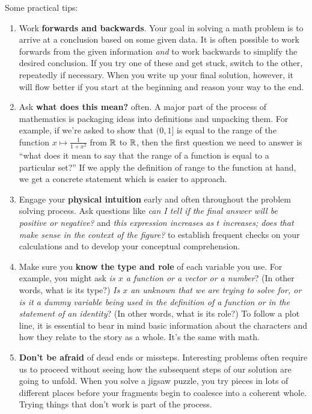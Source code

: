 \documentclass{watsonbook}
\begin{document}
  Some practical tips: 
  \begin{enumerate}[topsep=-4pt, itemsep=4pt]
  \item Work \textbf{forwards and backwards}. Your goal in solving a
    math problem is to arrive at a conclusion based on some given
    data. It is often possible to work forwards from the given
    information \textit{and} to work backwards to simplify the desired
    conclusion. If you try one of these and get stuck, switch to the
    other, repeatedly if necessary. When you write up your final
    solution, however, it will flow better if you start at the beginning
    and reason your way to the end. 
  \item Ask \textbf{what does this mean?} often. A major part of the
    process of mathematics is packaging ideas into definitions and
    unpacking them. For example, if we're asked to show that $(0,1]$
    is equal to the range of the function $x\mapsto \frac{1}{1+x^2}$
    from $\mathbb{R}$ to $\mathbb{R}$, then the first question we need to answer is
    ``what does it mean to say that the range of a function is equal
    to a particular set?'' If we apply the definition of range to the
    function at hand, we get a concrete statement which is easier to
    approach.
  \item Engage your \textbf{physical intuition} early and often
    throughout the problem solving process. Ask questions like
    \textit{can I tell if the final answer will be positive or
      negative?} and \textit{this expression increases as $t$
      increases; does that make sense in the context of the figure?} to
    establish frequent checks on your calculations and to develop your
    conceptual comprehension.
  \item Make sure you \textbf{know the type and role} of each variable
    you use. For example, you might ask \textit{is $x$ a function or a
      vector or a number}? (In other words, what is its type?)
    \textit{Is $x$ an unknown that we are trying to solve for, or is
      it a dummy variable being used in the definition of a function
      or in the statement of an identity}? (In other words, what is
    its role?) To follow a plot line, it is essential to bear in mind
    basic information about the characters and how they relate to the
    story as a whole. It's the same with math.
  \item \textbf{Don't be afraid} of dead ends or missteps. Interesting
    problems often require us to proceed without seeing how the
    subsequent steps of our solution are going to unfold. When you
    solve a jigsaw puzzle, you try pieces in lots of different places
    before your fragments begin to coalesce into a coherent
    whole. Trying things that don't work is part of the process.
  \end{enumerate}
\end{document}

